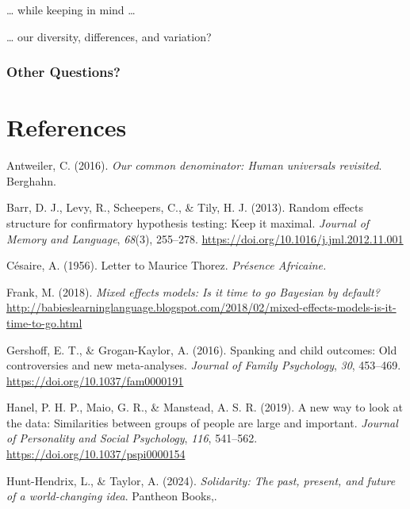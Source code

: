 \documentclass[
  letterpaper,
  DIV=11,
  numbers=noendperiod]{scrartcl}
\newlength{\cslhangindent}
\newenvironment{CSLReferences}[2] %
 {\begin{list}{}{%
  \setlength{\itemindent}{0pt}
  \setlength{\leftmargin}{0pt}
  \setlength{\parsep}{0pt}
  \ifodd #1
   \setlength{\leftmargin}{\cslhangindent}
   \setlength{\itemindent}{-1\cslhangindent}
  \fi
  \setlength{\itemsep}{#2\baselineskip}}}
 {\end{list}}
\begin{document}
\ldots{} while keeping in mind \ldots{}

{\ldots{} our diversity, differences, and variation?}

\subsubsection{\texorpdfstring{\textbf{Other
Questions?}}{Other Questions?}}\label{other-questions}

\section*{References}\label{references-1}

\protect{}\label{refs}
\begin{CSLReferences}{1}{0}
Antweiler, C. (2016). \emph{Our common denominator: Human universals
revisited}. Berghahn.

Barr, D. J., Levy, R., Scheepers, C., \& Tily, H. J. (2013). Random
effects structure for confirmatory hypothesis testing: Keep it maximal.
\emph{Journal of Memory and Language}, \emph{68}(3), 255--278.
\url{https://doi.org/10.1016/j.jml.2012.11.001}

Césaire, A. (1956). Letter to {M}aurice {T}horez. \emph{Présence
Africaine.}

Frank, M. (2018). \emph{Mixed effects models: Is it time to go
{B}ayesian by default?}
\url{http://babieslearninglanguage.blogspot.com/2018/02/mixed-effects-models-is-it-time-to-go.html}

Gershoff, E. T., \& Grogan-Kaylor, A. (2016). Spanking and child
outcomes: Old controversies and new meta-analyses. \emph{Journal of
Family Psychology}, \emph{30}, 453--469.
\url{https://doi.org/10.1037/fam0000191}

Hanel, P. H. P., Maio, G. R., \& Manstead, A. S. R. (2019). A new way to
look at the data: Similarities between groups of people are large and
important. \emph{Journal of Personality and Social Psychology},
\emph{116}, 541--562. \url{https://doi.org/10.1037/pspi0000154}

Hunt-Hendrix, L., \& Taylor, A. (2024). \emph{Solidarity: The past,
present, and future of a world-changing idea}. Pantheon Books,.


\end{CSLReferences}
\end{document}

